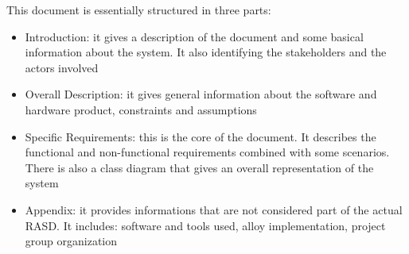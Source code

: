 This document is essentially structured in three parts:
\begin{itemize}
	\item Introduction: it gives a description of the  document and some basical information about the system. It also identifying the stakeholders and the actors involved
	\item Overall Description: it gives general information about the software and hardware product, constraints and assumptions
	\item Specific Requirements: this is the core of the document. It describes the functional and non-functional requirements combined with some scenarios. There is also a class diagram that gives an overall representation of the system
	\item Appendix: it provides informations that are not considered part of the actual RASD. It includes: software and tools used, alloy implementation, project group organization	
\end{itemize}